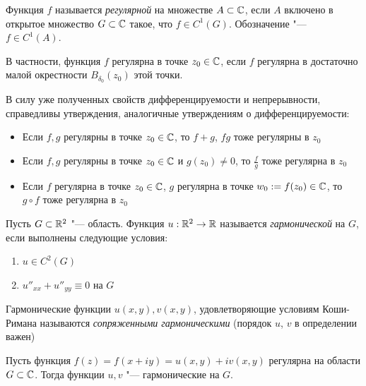 \begin{definition}
	Функция $f$ называется \textit{регулярной} на множестве $A \subset \mathbb{C}$, если $A$ включено в открытое множество $G \subset \mathbb{C}$ такое, что $f \in C^1(G)$. Обозначение "--- $f \in C^1(A)$.
\end{definition}

\begin{note}
	В частности, функция $f$ регулярна в точке $z_0 \in \mathbb{C}$, если $f$ регулярна в достаточно малой окрестности $B_{\delta_0}(z_0)$ этой точки.
\end{note}

\begin{note}
	В силу уже полученных свойств дифференцируемости и непрерывности, справедливы утверждения, аналогичные утверждениям о дифференцируемости:
	\begin{itemize}
		\item Если $f, g$ регулярны в точке $z_0 \in \mathbb{C}$, то $f + g$, $fg$ тоже регулярны в $z_0$
		\item Если $f, g$ регулярны в точке $z_0 \in \mathbb{C}$ и $g(z_0) \ne 0$, то $\frac fg$ тоже регулярна в $z_0$
		\item Если $f$ регулярна в точке $z_0 \in \mathbb{C}$, $g$ регулярна в точке $w_0 := f(z_0) \in \mathbb{C}$, то $g \circ f$ тоже регулярна в $z_0$
	\end{itemize}
\end{note}

\begin{definition}
	Пусть $G \subset \mathbb{R}^2$ "--- область. Функция $u : \mathbb{R}^2 \to \mathbb{R}$ называется \textit{гармонической} на $G$, если выполнены следующие условия:
	\begin{enumerate}
		\item $u \in C^2(G)$
		\item $u''_{xx} + u''_{yy} \equiv 0$ на $G$
	\end{enumerate}
\end{definition}

\begin{unnecessary}
    \begin{definition}
	Гармонические функции $u(x,y), v(x,y)$, удовлетворяющие условиям Коши-Римана называются \textit{сопряженными гармоническими} (порядок $u$, $v$ в определении важен)
    \end{definition}
\end{unnecessary}


\begin{proposition}
	Пусть функция $f(z) = f(x + iy) = u(x, y) + iv(x, y)$ регулярна на области $G \subset \mathbb{C}$. Тогда функции $u, v$ "--- гармонические на $G$.
\end{proposition}

